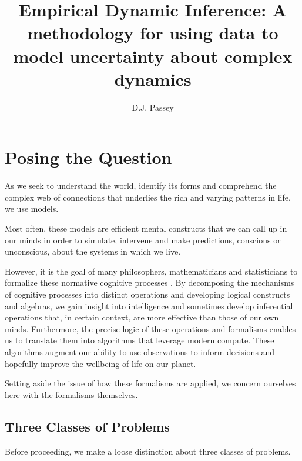\documentclass{article}
\title{Empirical Dynamic Inference: A  methodology for using data to model uncertainty about complex dynamics}
\author{D.J. Passey}
\begin{document}
\maketitle

\section*{Posing the Question}
As we seek to understand the world, identify its forms and comprehend the complex web of connections
that underlies the rich and varying patterns in life, we use models.

Most often, these models are efficient mental constructs that we can call up in our minds in order to simulate,
intervene and make predictions, conscious or unconscious, about the systems in which we live.

However, it is the goal of many philosophers, mathematicians and statisticians to formalize these
normative cognitive processes \cite{woodard2021causation}. By decomposing the mechanisms of cognitive processes into
distinct operations and developing logical constructs and algebras, we gain insight into intelligence
and sometimes develop inferential operations that, in certain context, are more effective than those
of our own minds. Furthermore, the precise logic of these operations and formalisms enables us to translate
them into algorithms that leverage modern compute. These algorithms augment our ability to use observations
to inform decisions and hopefully improve the wellbeing of life on our planet.

Setting aside the issue of how these formalisms are applied, we concern ourselves here with the formalisms
themselves.

\subsection*{Three Classes of Problems}

Before proceeding, we make a loose distinction about three classes of problems.
\end{document}
